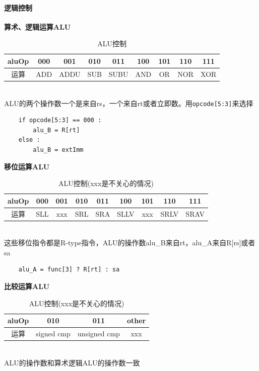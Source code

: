 \documentclass[UTF8]{ctexart}
\begin{document}
\paragraph{逻辑控制} 
\textbf{算术、逻辑运算ALU} \\
\begin{table}[h]
    \centering
    \begin{tabular}{|c|c|c|c|c|c|c|c|c|}
        \hline
        aluOp & 000 & 001 & 010 & 011 & 100 & 101 & 110 & 111 \\ \hline
        运算  & ADD & ADDU & SUB & SUBU & AND & OR & NOR & XOR \\ \hline
    \end{tabular}
    \caption{ALU控制}
\end{table} \\
ALU的两个操作数一个是来自rs，一个来自rt或者立即数。用\texttt{opcode[5:3]}来选择
\begin{verbatim}
    if opcode[5:3] == 000 :
        alu_B = R[rt]
    else :
        alu_B = extImm 
\end{verbatim}

\textbf{移位运算ALU} \\
\begin{table}[h]
    \centering
    \begin{tabular}{|c|c|c|c|c|c|c|c|c|}
        \hline
        aluOp & 000 & 001 & 010 & 011 & 100 & 101 & 110 & 111 \\ \hline
        运算  & SLL & xxx & SRL & SRA & SLLV & xxx & SRLV & SRAV \\ \hline
    \end{tabular}
        \caption{ALU控制(xxx是不关心的情况)}
\end{table}\\
这些移位指令都是R-type指令，ALU的操作数alu\_B来自rt，alu\_A来自R[rs]或者sa
\begin{verbatim}
    alu_A = func[3] ? R[rt] : sa
\end{verbatim}

\textbf{比较运算ALU} \\
\begin{table}[h]
    \centering
    \begin{tabular}{|c|c|c|c|}
        \hline
        aluOp & 010 & 011 & other\\ \hline
        运算  & signed cmp & unsigned cmp  & xxx \\ \hline
    \end{tabular}
        \caption{ALU控制(xxx是不关心的情况)}
\end{table}\\
ALU的操作数和算术逻辑ALU的操作数一致
\end{document}
